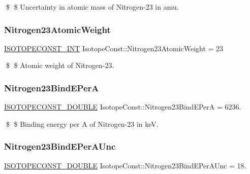 \$ \$ Uncertainty in atomic mass of Nitrogen-\/23 in amu. \mbox{\label{group___isotope_const-_nitrogen-_n23_ga0733b733c3f5320029c60dbc1f1b4678}} 
\subsubsection{\texorpdfstring{Nitrogen23\+Atomic\+Weight}{Nitrogen23AtomicWeight}}
{\footnotesize\ttfamily \mbox{\hyperlink{group___isotope_const-_macros_ga5f18360b3e99483a35c32d789e62621c}{I\+S\+O\+T\+O\+P\+E\+C\+O\+N\+S\+T\+\_\+\+I\+NT}} Isotope\+Const\+::\+Nitrogen23\+Atomic\+Weight = 23}

\$ \$ Atomic weight of Nitrogen-\/23. \mbox{\label{group___isotope_const-_nitrogen-_n23_gac633a231638ce4c9c27a808fca039d11}} 
\subsubsection{\texorpdfstring{Nitrogen23\+Bind\+E\+PerA}{Nitrogen23BindEPerA}}
{\footnotesize\ttfamily \mbox{\hyperlink{group___isotope_const-_macros_ga8f45a7272ce02c0b4c65c44636ed719a}{I\+S\+O\+T\+O\+P\+E\+C\+O\+N\+S\+T\+\_\+\+D\+O\+U\+B\+LE}} Isotope\+Const\+::\+Nitrogen23\+Bind\+E\+PerA = 6236.}

\$ \$ Binding energy per A of Nitrogen-\/23 in keV. \mbox{\label{group___isotope_const-_nitrogen-_n23_ga961ff1c6adae1ff3e2326552996060b8}} 
\subsubsection{\texorpdfstring{Nitrogen23\+Bind\+E\+Per\+A\+Unc}{Nitrogen23BindEPerAUnc}}
{\footnotesize\ttfamily \mbox{\hyperlink{group___isotope_const-_macros_ga8f45a7272ce02c0b4c65c44636ed719a}{I\+S\+O\+T\+O\+P\+E\+C\+O\+N\+S\+T\+\_\+\+D\+O\+U\+B\+LE}} Isotope\+Const\+::\+Nitrogen23\+Bind\+E\+Per\+A\+Unc = 18.}

